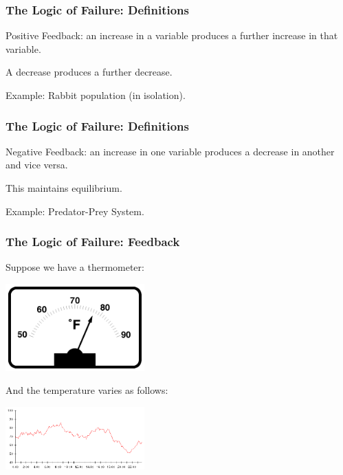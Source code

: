 \begin{frame}
\frametitle{The Logic of Failure: Definitions}
\begin{changemargin}{1cm}
\alert{Positive Feedback}: an increase in a variable produces a further increase in that variable.

A decrease produces a further decrease.

Example: Rabbit population (in isolation).

\end{changemargin}
\end{frame}

\begin{frame}
\frametitle{The Logic of Failure: Definitions}
\begin{changemargin}{1cm}
\alert{Negative Feedback}: an increase in one variable produces a decrease in another and vice versa.

This maintains equilibrium.

Example: Predator-Prey System.

\end{changemargin}
\end{frame}

\begin{frame}
\frametitle{The Logic of Failure: Feedback}
\begin{changemargin}{1cm}
Suppose we have a thermometer:
\begin{center}
	\includegraphics[width=0.4\textwidth]{images/thermometer.png}
\end{center}

And the temperature varies as follows:

\begin{center}
	\includegraphics[width=0.4\textwidth]{images/temperature-chart.png}
\end{center}


\end{changemargin}
\end{frame}


